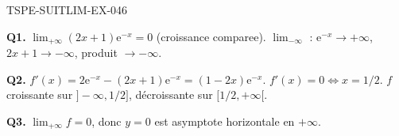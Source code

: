 \begin{corrige}{TSPE-SUITLIM-EX-046}

\textbf{Q1.} $\lim_{+\infty} (2x+1)\mathrm{e}^{-x} = 0$ (croissance comparee). $\lim_{-\infty}$ : $\mathrm{e}^{-x} \to +\infty$, $2x+1 \to -\infty$, produit $\to -\infty$.

\textbf{Q2.} $f'(x) = 2\mathrm{e}^{-x} - (2x+1)\mathrm{e}^{-x} = (1-2x)\mathrm{e}^{-x}$. $f'(x) = 0 \iff x = 1/2$. $f$ croissante sur $]-\infty, 1/2]$, décroissante sur $[1/2, +\infty[$.

\textbf{Q3.} $\lim_{+\infty} f = 0$, donc $y=0$ est asymptote horizontale en $+\infty$.

\end{corrige}
